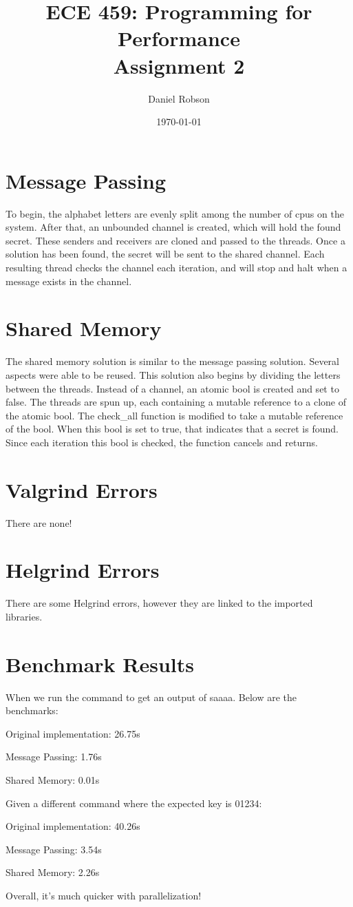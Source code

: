 \documentclass[12pt]{article}
\title{ECE 459: Programming for Performance\\Assignment 2}
\author{Daniel Robson}
\date{\today}
\begin{document}
\maketitle

\section{Message Passing}
To begin, the alphabet letters are evenly split among the number of cpus on the system.
After that, an unbounded channel is created, which will hold the found secret.
These senders and receivers are cloned and passed to the threads.
Once a solution has been found, the secret will be sent to the shared channel.
Each resulting thread checks the channel each iteration, and will stop and halt when a message exists in the channel.

\section{Shared Memory}
The shared memory solution is similar to the message passing solution.
Several aspects were able to be reused.
This solution also begins by dividing the letters between the threads.
Instead of a channel, an atomic bool is created and set to false.
The threads are spun up, each containing a mutable reference to a clone of the atomic bool.
The check\_all function is modified to take a mutable reference of the bool.
When this bool is set to true, that indicates that a secret is found.
Since each iteration this bool is checked, the function cancels and returns.


\section{Valgrind Errors}
There are none!

\section{Helgrind Errors}
There are some Helgrind errors, however they are linked to the imported libraries.


\section{Benchmark Results}
When we run the command to get an output of saaaa. Below are the benchmarks:

Original implementation: 26.75s

Message Passing: 1.76s

Shared Memory: 0.01s

Given a different command where the expected key is 01234:

Original implementation: 40.26s

Message Passing: 3.54s

Shared Memory: 2.26s

Overall, it's much quicker with parallelization!
\end{document}
